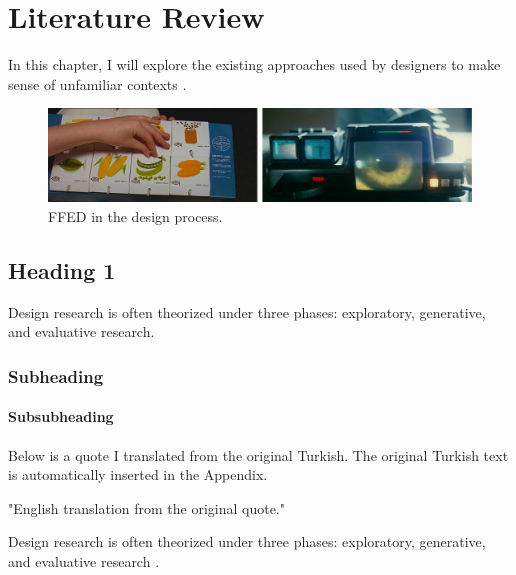 \chapter{Literature Review}
\label{chp:b2}

	In this chapter, I will explore the existing approaches used by designers to make sense of unfamiliar contexts \cite{aaltonenHowWeMake2005}.

	\begin{figure}[h!]
	\centering
	\includegraphics[width=.99\textwidth]{figures/2001-Bladerunner}
	\caption{FFED in the design process.}
	\label{fig:FFED}
	\end{figure}

\section{Heading 1}
Design research is often theorized under three phases: exploratory, generative, and evaluative research.

	\subsection{Subheading}
	\label{subsec:subheading}
	
	\subsubsection{Subsubheading}
	\label{subsubsec:subsubheading}
	Below is a quote I translated from the original Turkish. The original Turkish text is automatically inserted in the Appendix.
	
	\begin{displayquote}
		"English translation from the original quote."
	\end{displayquote}
	
	Design research is often theorized under three phases: exploratory, generative, and evaluative research \cite{aaltonenHowWeMake2005}. 